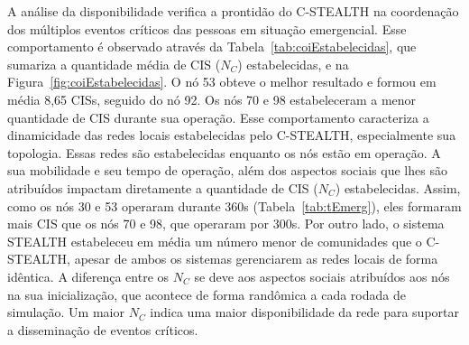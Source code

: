 \documentclass[12pt]{article}
\begin{document}
A análise da disponibilidade verifica a prontidão do \mbox{C-STEALTH} na coordenação dos múltiplos eventos críticos das pessoas em situação emergencial. Esse comportamento é observado através da
Tabela~\ref{tab:coiEstabelecidas}, 
que sumariza a quantidade média de
CIS ($N_{C}$) estabelecidas, e na Figura~\ref{fig:coiEstabelecidas}. %
O nó 53 obteve o melhor resultado e formou em média 8,65
CISs, seguido do nó 92.
Os nós 70 e 98 estabeleceram a menor quantidade de
CIS durante sua operação. Esse comportamento caracteriza a dinamicidade das redes locais estabelecidas pelo \mbox{C-STEALTH}, especialmente sua topologia. 
Essas redes são estabelecidas enquanto os nós estão em operação. A sua mobilidade
e seu tempo de operação, além dos aspectos sociais que lhes são atribuídos impactam diretamente a quantidade de CIS ($N_C$) estabelecidas. 
Assim, 
como os nós 30 e 53 operaram durante 360s (Tabela~\ref{tab:tEmerg}), eles formaram mais
CIS que os nós 70 e 98, que operaram por 300s. Por outro lado, o sistema STEALTH estabeleceu em média um número menor de comunidades que o C-STEALTH, apesar de ambos os sistemas gerenciarem as redes locais de forma idêntica. A diferença entre os $N_C$ se deve aos aspectos sociais atribuídos aos nós na sua inicialização, que acontece de forma randômica a cada rodada de simulação. 
Um maior $N_C$ 
indica uma maior disponibilidade da rede para suportar a disseminação de
eventos críticos.

\vspace{-0.2cm}
\end{document}
